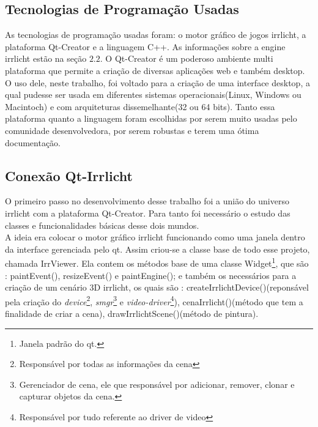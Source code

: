 

	\subsection{Tecnologias de Programação Usadas} 
	As tecnologias de programação usadas foram: o motor gráfico de jogos irrlicht, a plataforma Qt-Creator e a linguagem C++. As informações sobre a engine irrlicht estão na seção $2.2$. O Qt-Creator é um poderoso ambiente multi plataforma que permite a criação de diversas aplicações web e também desktop. O uso dele, neste trabalho, foi voltado para a criação de uma interface desktop, a qual pudesse ser usada em diferentes sistemas operacionais(Linux, Windows ou Macintoch) e com arquiteturas dissemelhante(32 ou 64 bits). Tanto essa plataforma quanto a linguagem foram escolhidas por serem muito usadas pelo comunidade desenvolvedora, por serem robustas e terem uma ótima documentação.
	
	\subsection{Conexão Qt-Irrlicht}
	O primeiro passo no desenvolvimento desse trabalho foi a união do universo irrlicht com a plataforma Qt-Creator. Para tanto foi necessário o estudo das classes e funcionalidades básicas desse dois mundos.\\
	
	A ideia era colocar o motor gráfico irrlicht funcionando como uma janela dentro da interface gerenciada pelo qt. Assim criou-se a classe base de todo esse projeto, chamada IrrViewer. Ela contem os métodos base de uma classe Widget\footnote{Janela padrão do qt.}, que são : paintEvent(), resizeEvent() e paintEngine(); e também os necessários para a criação de um cenário 3D irrlicht, os quais são : createIrrlichtDevice()(reponsável pela criação do \textit{device}\footnote{Responsável por todas as informações da cena}, \textit{smgr}\footnote{Gerenciador de cena, ele que responsável por adicionar, remover, clonar e capturar objetos da cena.} e \textit{video-driver}\footnote{Responsável por tudo referente ao driver de video}), cenaIrrlicht()(método que tem a finalidade de criar a cena), drawIrrlichtScene()(método de pintura).\\
	
